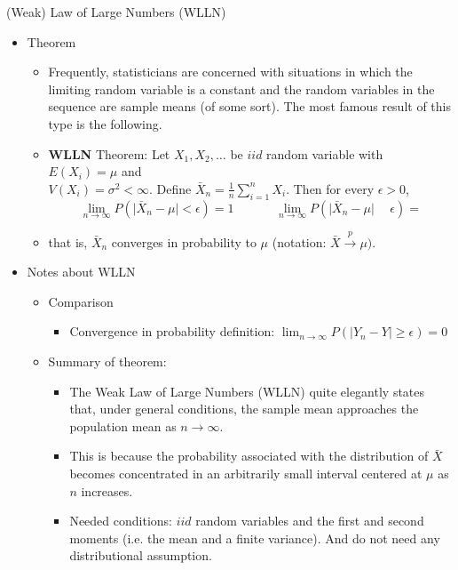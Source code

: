 \documentclass{article}
\newcommand{\convp}[2]{#1 \overset{p} \to #2}		%
\begin{document}
(Weak) Law of Large Numbers (WLLN)\bigskip
\begin{itemize}
    \item Theorem
    \begin{itemize}
        \item Frequently, statisticians are concerned with situations in which the limiting random variable is a constant and the random variables in the sequence are sample means (of some sort). The most famous result of this type is the following.
        \item \textbf{WLLN} Theorem: Let $X_1 ,X_2, \ldots$ be $iid$ random variable with $E(X_i) = \mu$ and \\ $V(X_i) = \sigma^2 < \infty$. Define $\displaystyle \bar{X}_n = \frac{1}{n} \sum_{i = 1}^n X_i$. Then for every $\epsilon > 0$,
        \[\lim_{n \to \infty} P(\lvert \bar{X}_n - \mu \rvert < \epsilon) = 1 \hspace{40pt} \lim_{n \to \infty} P(\lvert \bar{X}_n - \mu \rvert \hspace{15pt} \epsilon) = \] 
        \item[] that is, $\bar{X}_n$ converges in probability to $\mu$ (notation: $\convp{\bar{X}}{\mu})$.\bigskip
    \end{itemize}
    \item Notes about WLLN
    \begin{itemize}
        \item Comparison
        \begin{itemize}
            \item Convergence in probability definition: $\displaystyle \lim_{n \to \infty} P(\lvert Y_n - Y \rvert \ge \epsilon) = 0$\vspace{20pt}
        \end{itemize}\bigskip
        \item Summary of theorem:
        \begin{itemize}
            \item The Weak Law of Large Numbers (WLLN) quite elegantly states that, under general conditions, the sample mean approaches the population mean as $n \to \infty$.
            \item[] This is because the probability associated with the distribution of $\bar{X}$ becomes concentrated in an arbitrarily small interval centered at $\mu$ as $n$ increases. 
            \item Needed conditions: $iid$ random variables and the first and second moments (i.e. the mean and a finite variance). And do not need any distributional assumption.

\end{itemize}
\end{itemize}
\end{itemize}
\end{document}
